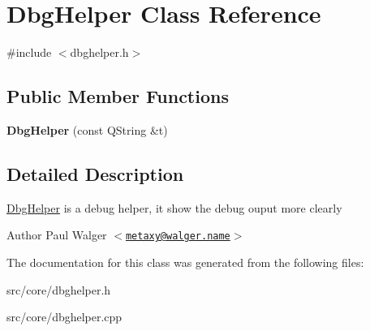 \hypertarget{classDbgHelper}{
\section{DbgHelper Class Reference}
\label{classDbgHelper}
}


{\ttfamily \#include $<$dbghelper.h$>$}

\subsection*{Public Member Functions}
\begin{DoxyCompactItemize}
\item 
\hypertarget{classDbgHelper_ad592120d919e04305d93c0aff04fd85f}{
{\bfseries DbgHelper} (const QString \&t)}
\label{classDbgHelper_ad592120d919e04305d93c0aff04fd85f}

\end{DoxyCompactItemize}


\subsection{Detailed Description}
\hyperlink{classDbgHelper}{DbgHelper} is a debug helper, it show the debug ouput more clearly

\begin{DoxyAuthor}{Author}
Paul Walger $<$\href{mailto:metaxy@walger.name}{\tt metaxy@walger.name}$>$ 
\end{DoxyAuthor}


The documentation for this class was generated from the following files:\begin{DoxyCompactItemize}
\item 
src/core/dbghelper.h\item 
src/core/dbghelper.cpp\end{DoxyCompactItemize}
